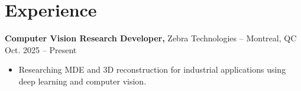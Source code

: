 \documentclass[11pt]{article}       %
\begin{document}

\section*{Experience}

\ifdefined\cvResearch
      \textbf{Computer Vision Research Developer,} {Zebra Technologies} -- Montreal, QC \hfill Oct. 2025 -- Present \\
      \vspace{-9pt}
      \begin{itemize}
            \item Researching MDE and 3D reconstruction for industrial applications using deep
                  learning and computer vision.
      \end{itemize}
\fi
\end{document}
